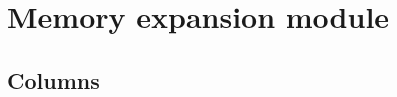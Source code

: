 \section{Memory expansion module}

\subsection{Columns}                                                           
